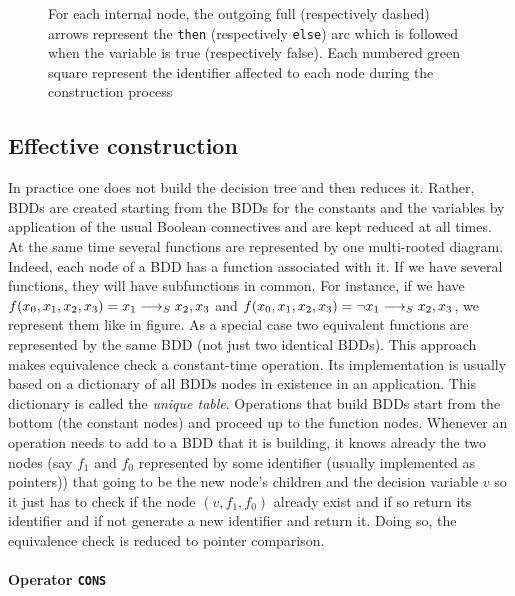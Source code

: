 \documentclass[a4paper,10pt]{article}
\newcommand{\includeframe}[4]{\makebox[#2\linewidth]{\texttt{[image: \#4]}}}
\begin{document}
\begin{figure}
\centering
\includeframe{1}{1}{}{draws.pdf}
\caption{For each internal node, the outgoing full (respectively dashed) arrows represent the \texttt{then} (respectively \texttt{else}) arc which is followed when the variable is true (respectively false). Each numbered green square represent the identifier affected to each node during the construction process}
\label{draws1}
\end{figure}


\subsection{Effective construction}
In practice one does not build the decision tree and then reduces it.
Rather, BDDs are created starting from the BDDs for the constants and the variables by application of the usual Boolean connectives and are kept reduced at all times.
At the same time several functions are represented by one multi-rooted diagram.
Indeed, each node of a BDD has a function associated with it.
If we have several functions, they will have subfunctions in common.
For instance, if we have $f(x_0, x_1, x_2, x_3) = x_1 \longrightarrow_S x_2, x_3$ and $f(x_0, x_1, x_2, x_3) = \lnot x_1 \longrightarrow_S x_2, x_3$, we represent them like in figure. As a special case two equivalent functions are represented by the same BDD (not just two identical BDDs).
This approach makes equivalence check a constant-time operation.
Its implementation is usually based on a dictionary of all BDDs nodes in existence in an application.
This dictionary is called the \textit{unique table}.
Operations that build BDDs start from the bottom (the constant nodes) and proceed up to the function nodes.
Whenever an operation needs to add to a BDD that it is building, it knows already the two nodes (say $f_1$ and $f_0$ represented by some identifier (usually implemented as pointers)) that going to be the new node's children and the decision variable $v$ so it just has to check if the node $(v, f_1, f_0)$ already exist and if so return its identifier and if not generate a new identifier and return it.
Doing so, the equivalence check is reduced to pointer comparison.

\paragraph{Operator \texttt{CONS}\\}
\end{document}
